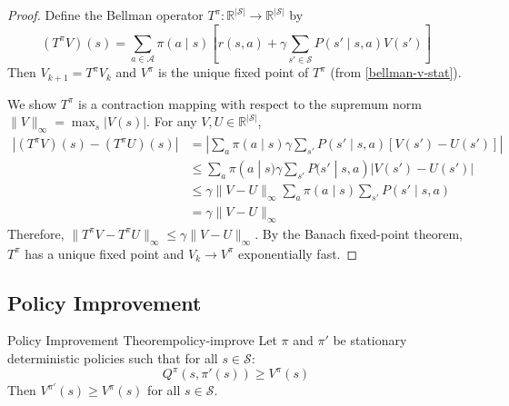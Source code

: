 \documentclass[a4paper, 11pt]{article}
\numberwithin{equation}{section}
\theoremstyle{plain}
\theoremstyle{definition}
\newcommand{\1}{{\mathbbm 1}}
\newcommand{\mc}[1]{\mathcal{#1}}
\newcommand{\R}{{\mathbb{R}}}
\begin{document}
	\begin{proof}
		Define the Bellman operator $T^{\pi}: \R^{|\mc{S}|} \to \R^{|\mc{S}|}$ by
		\begin{equation*}
			(T^{\pi} V)(s) = \sum_{a \in \mc{A}} \pi(a\;|\; s) \left[ r(s, a) + \gamma \sum_{s' \in \mc{S}} P(s'\;|\; s, a) V(s') \right]
		\end{equation*}
		Then $V_{k+1} = T^{\pi} V_k$ and $V^{\pi}$ is the unique fixed point of $T^{\pi}$ (from \eqref{bellman-v-stat}).
		
		We show $T^{\pi}$ is a contraction mapping with respect to the supremum norm $\|V\|_{\infty} = \max_{s} |V(s)|$. For any $V, U \in \R^{|\mc{S}|}$,
		\begin{equation*}
			\begin{split}
				|(T^{\pi} V)(s) - (T^{\pi} U)(s)| &= \left| \sum_{a} \pi(a\;|\; s) \gamma \sum_{s'} P(s'\;|\; s, a) [V(s') - U(s')] \right|\\
				&\leq \sum_{a} \pi(a\;|\; s) \gamma \sum_{s'} P(s'\;|\; s, a) |V(s') - U(s')|\\
				&\leq \gamma \|V - U\|_{\infty} \sum_{a} \pi(a\;|\; s) \sum_{s'} P(s'\;|\; s, a)\\
				&= \gamma \|V - U\|_{\infty}
			\end{split}
		\end{equation*}
		Therefore, $\|T^{\pi} V - T^{\pi} U\|_{\infty} \leq \gamma \|V - U\|_{\infty}$. By the Banach fixed-point theorem, $T^{\pi}$ has a unique fixed point and $V_k \to V^{\pi}$ exponentially fast.
	\end{proof}
	
	\subsection{Policy Improvement}
	
	\begin{ftheo}{Policy Improvement Theorem}{policy-improve}
		Let $\pi$ and $\pi'$ be stationary deterministic policies such that for all $s \in \mc{S}$:
		\begin{equation}\label{greedy-condition}
			Q^{\pi}(s, \pi'(s)) \geq V^{\pi}(s)
		\end{equation}
		Then $V^{\pi'}(s) \geq V^{\pi}(s)$ for all $s \in \mc{S}$.
	\end{ftheo}
	
\end{document}
